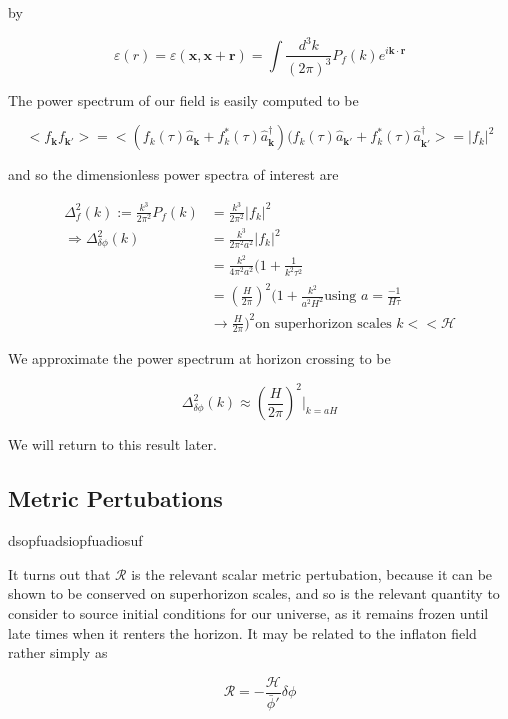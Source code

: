 \documentclass[a4paper,11pt]{article}
\renewcommand{\v}[1]{\mathbf{#1}}
\newcommand{\bphi}{\bar{\phi}}
\newcommand{\ann}[1]{\hat{a}_{\v{#1}}}
\newcommand{\cre}[1]{\hat{a}^\dagger_{\v{#1}}}
\newcommand{\fint}[1]{\int \frac{d^3 #1}{(2\pi)^3}}
\begin{document}
by

\begin{equation}
\varepsilon(r)=\varepsilon(\v{x},\v{x}+\v{r})=\fint{k} P_f(k)e^{i\v{k}\cdot\v{r}}
\end{equation}


The power spectrum of our field is easily computed to be 

\begin{equation}
<f_{\v{k}}f_{\v{k'}}> = <(f_k(\tau)\ann{k}+f_k^*(\tau)\cre{k})(f_k(\tau)\ann{k'}+f_k^*(\tau)\cre{k'}> = |f_k|^2
\end{equation}

and so the dimensionless power spectra of interest are  

\begin{align}
\Delta^2_f(k):=\frac{k^3}{2\pi^2}P_f(k) &= \frac{k^3}{2\pi^2}|f_k|^2\\
\Rightarrow \Delta^2_{\delta\phi}(k) &=\frac{k^3}{2\pi^2a^2}|f_k|^2\\
&=\frac{k^2}{4\pi^2a^2}(1+\frac{1}{k^2\tau^2}\\
&=(\frac{H}{2\pi})^2(1+\frac{k^2}{a^2H^2} \text{using $a=\frac{-1}{H\tau}$}\\
&\rightarrow \frac{H}{2\pi})^2 \text{on superhorizon scales $k<<\mathcal{H}$}
\label{inflatonpower}
\end{align}

We approximate the power spectrum at horizon crossing to be 

\begin{equation}
\Delta^2_{\delta\phi}(k) \approx (\frac{H}{2\pi})^2\rvert_{k=aH}
\end{equation}

We will return to this result later.

\subsection{Metric Pertubations}

dsopfuadsiopfuadiosuf

It turns out that $\mathcal{R}$ is the relevant scalar metric pertubation, because it can be shown to be conserved on superhorizon scales, and so is the relevant quantity to consider to source initial conditions for our universe, as it remains frozen until late times when it renters the horizon. It may be related to the inflaton field rather simply as 

\begin{equation}
\mathcal{R} = -\frac{\mathcal{H}}{\bphi'}\delta\phi
\end{equation}
\end{document}
